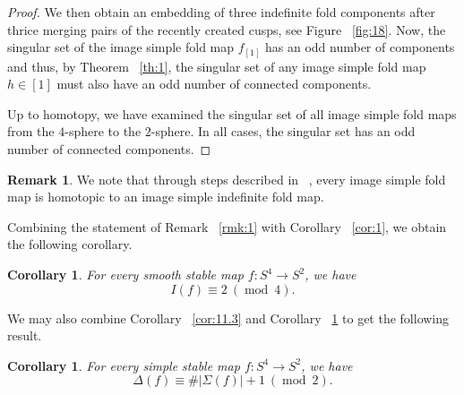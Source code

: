 \documentclass[12pt]{amsart}
\def\mod{{\mathop\mathrm{mod}\ }}
\newtheorem{corollary}[theorem]{Corollary}
\theoremstyle{definition}
\newtheorem{remark}[theorem]{Remark}
\begin{document}
{\begin{proof}
We then obtain an embedding of three indefinite fold components after thrice merging pairs of the recently created cusps, see Figure ~\ref{fig:18}.  Now,  the singular set of the image simple fold map $f_{[1]}$ has an odd number of components and thus,  by Theorem ~\ref{th:1},  the singular set of any image simple fold map $h\in[1]$ must also have an odd number of connected components.  

Up to homotopy,  we have examined the singular set of all image simple fold maps from the $4$-sphere to the $2$-sphere.  In all cases,  the singular set has an odd number of connected components. 
\end{proof}

\begin{remark} We note that through steps described in ~\cite{Sae}, every image simple fold map is homotopic to an image simple indefinite fold map. 
\end{remark}

Combining the statement of Remark ~\ref{rmk:1} with Corollary ~\ref{cor:1},  we obtain the following corollary.

\begin{corollary}\label{cor:12.6}
For every smooth stable map $f:S^4 \rightarrow S^2$, we have 
\[
I(f) \equiv 2 \ (\mod 4).
\]
\end{corollary}

We may also combine Corollary ~\ref{cor:11.3} and Corollary ~\ref{cor:12.6} to get the following result. 
\begin{corollary}
For every simple stable map $f:S^4 \rightarrow S^2$,  we have
\[
\Delta(f) \equiv \#|\Sigma(f)| + 1 ~(\mod 2). 
\]
\end{corollary}

}
\end{document}
